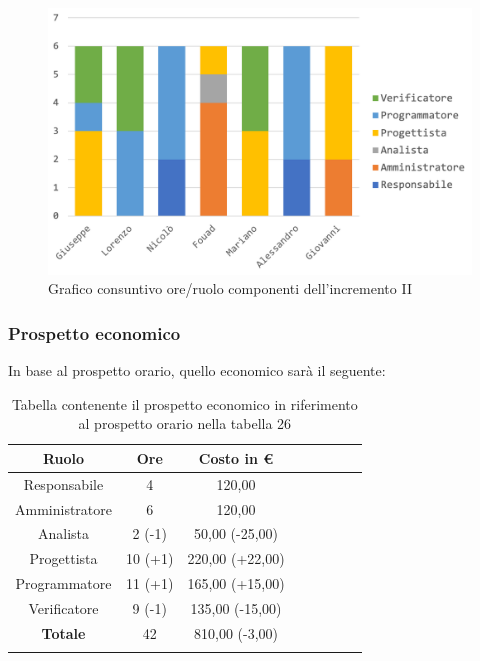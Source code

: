 			\begin{figure}[H]
				\centering
				\includegraphics[width=0.8\linewidth]{images/consuntivo/ConsIncr2-1.png}
				\caption{Grafico consuntivo ore/ruolo componenti dell'incremento II}
				\label{fig:consuntivo grafico suddivione ruoli incremento II}
			\end{figure}
			
		\subsubsection{Prospetto economico}
			In base al prospetto orario, quello economico sarà il seguente: 
			
			\begin{longtable}{|c|c|c|c|c|c|c|c}
				\hline
				\rowcolor{lighter-grayer}
				\textbf{Ruolo} & \textbf{Ore} & \textbf{Costo in €} \\
				\hline
				\endfirsthead
				\hline
			Responsabile 	    & 4 & 120,00\\
			\hline 
			\hline
			Amministratore	  & 6 & 120,00\\
			\hline
			\hline
			Analista 				& 2 (-1) & 50,00 (-25,00) \\
			\hline
			\hline
			Progettista 		  & 10 (+1) & 220,00 (+22,00)\\
			\hline
			\hline
			Programmatore 	 & 11 (+1) & 165,00 (+15,00)\\
			\hline
			\hline
			Verificatore 		  & 9 (-1) & 135,00 (-15,00) \\
			\hline
			\textbf{Totale} 	& 42 & 810,00 (-3,00) \\
			\hline
				
				\caption{Tabella contenente il prospetto economico in riferimento al prospetto orario nella tabella 26}
			\end{longtable}
			\pagebreak
			
